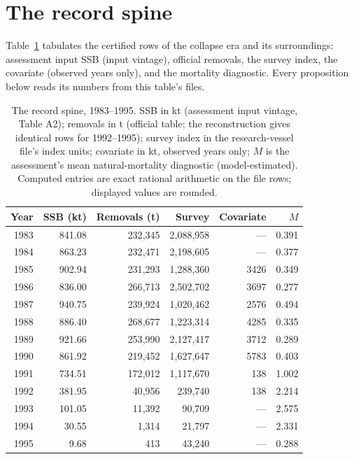 \documentclass[10pt,twocolumn]{article}
\theoremstyle{plain}
\theoremstyle{remark}
\begin{document}
\section{The record spine}\label{spine}

Table~\ref{tab:spine} tabulates the certified rows of the collapse era
and its surroundings: assessment input SSB (input vintage), official
removals, the survey index, the covariate (observed years only), and
the mortality diagnostic. Every proposition below reads its numbers
from this table's files.

\begin{table}[t]
\centering
\scriptsize
\setlength{\tabcolsep}{2.8pt}
\caption{The record spine, 1983--1995. SSB in kt (assessment input
vintage, Table A2); removals in t (official table; the reconstruction
gives identical rows for 1992--1995); survey index in the
research-vessel file's index units; covariate in kt, observed years
only; \(M\) is the assessment's mean natural-mortality diagnostic
(model-estimated). Computed entries are exact rational arithmetic on
the file rows; displayed values are rounded.}
\label{tab:spine}
\begin{tabular}{@{}r r r r r r@{}}
\toprule
Year & SSB (kt) & Removals (t) & Survey & Covariate & \(M\) \\
\midrule
1983 & 841.08 & 232{,}345 & 2{,}088{,}958 & --- & 0.391 \\
1984 & 863.23 & 232{,}471 & 2{,}198{,}605 & --- & 0.377 \\
1985 & 902.94 & 231{,}293 & 1{,}288{,}360 & 3426 & 0.349 \\
1986 & 836.00 & 266{,}713 & 2{,}502{,}702 & 3697 & 0.277 \\
1987 & 940.75 & 239{,}924 & 1{,}020{,}462 & 2576 & 0.494 \\
1988 & 886.40 & 268{,}677 & 1{,}223{,}314 & 4285 & 0.335 \\
1989 & 921.66 & 253{,}990 & 2{,}127{,}417 & 3712 & 0.289 \\
1990 & 861.92 & 219{,}452 & 1{,}627{,}647 & 5783 & 0.403 \\
1991 & 734.51 & 172{,}012 & 1{,}117{,}670 & 138 & 1.002 \\
1992 & 381.95 & 40{,}956 & 239{,}740 & 138 & 2.214 \\
1993 & 101.05 & 11{,}392 & 90{,}709 & --- & 2.575 \\
1994 & 30.55 & 1{,}314 & 21{,}797 & --- & 2.331 \\
1995 & 9.68 & 413 & 43{,}240 & --- & 0.288 \\
\bottomrule
\end{tabular}
\end{table}
\end{document}
